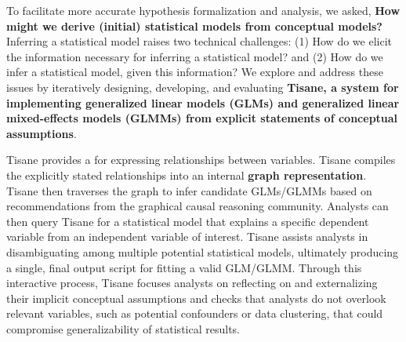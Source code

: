 To facilitate more accurate hypothesis formalization and analysis, we asked,
\textbf{How might we derive (initial) statistical models from conceptual
models?} Inferring a statistical model raises two technical challenges: (1) How
do we elicit the information necessary for inferring a statistical model? and
(2) How do we infer a statistical model, given this information? We explore and
address these issues by iteratively designing, developing, and evaluating
\textbf{Tisane, a system for implementing generalized linear models (GLMs) and
generalized linear mixed-effects models (GLMMs) from explicit statements of conceptual assumptions}. 

Tisane provides a \textbf{\SDSLlong} for expressing %
relationships between variables. Tisane compiles the explicitly stated
relationships into an internal \textbf{graph representation}. Tisane then
traverses the graph to infer candidate GLMs/GLMMs based on recommendations from
the graphical causal reasoning community. Analysts can then query Tisane for a
statistical model that explains a specific dependent variable from an
independent variable of interest. Tisane assists analysts in disambiguating
among multiple potential statistical models, ultimately producing a single,
final output script for fitting a valid GLM/GLMM.
Through this interactive process, Tisane focuses analysts on reflecting on and externalizing their
implicit conceptual assumptions and checks that analysts do not overlook
relevant variables, such as potential confounders or data clustering, that could
compromise generalizability of statistical results. %

